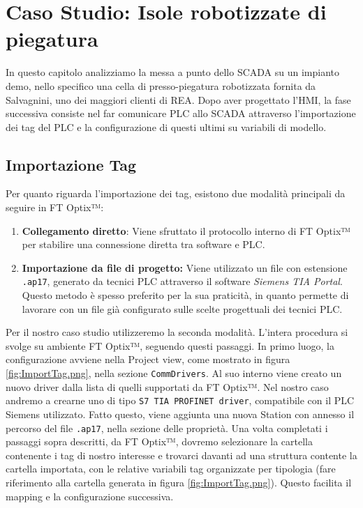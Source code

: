 \chapter{Caso Studio: Isole robotizzate di piegatura} \label{sec:CasoStudio}

In questo capitolo analizziamo la messa a punto dello SCADA su un impianto demo, nello specifico una cella di presso-piegatura robotizzata fornita da Salvagnini, uno dei maggiori clienti di REA. Dopo aver progettato l'HMI, la fase successiva consiste nel far comunicare PLC allo SCADA attraverso l'importazione dei tag del PLC e la configurazione di questi ultimi su variabili di modello.

\section{Importazione Tag}
Per quanto riguarda l'importazione dei tag, esistono due modalità principali da seguire in FT Optix™:
\begin{enumerate}
    \item \textbf{Collegamento diretto}: Viene sfruttato il protocollo interno di FT Optix™ per stabilire una connessione diretta tra software e PLC.
    \item \textbf{Importazione da file di progetto:} Viene utilizzato un file con estensione \verb|.ap17|, generato da tecnici PLC attraverso il software \textit{Siemens TIA Portal}. Questo metodo è spesso preferito per la sua praticità, in quanto permette di lavorare con un file già configurato sulle scelte progettuali dei tecnici PLC.
\end{enumerate}
Per il nostro caso studio utilizzeremo la seconda modalità. L'intera procedura si svolge su ambiente FT Optix™, seguendo questi passaggi. In primo luogo, la configurazione avviene nella Project view, come mostrato in figura \ref{fig:ImportTag.png}, nella sezione \verb|CommDrivers|. Al suo interno viene creato un nuovo driver dalla lista di quelli supportati da FT Optix™. Nel nostro caso andremo a crearne uno di tipo \verb|S7 TIA PROFINET driver|, compatibile con il PLC Siemens utilizzato. Fatto questo, viene aggiunta una nuova Station con annesso il percorso del file \verb|.ap17|, nella sezione delle proprietà. Una volta completati i passaggi sopra descritti, da FT Optix™, dovremo selezionare la cartella contenente i tag di nostro interesse e trovarci davanti ad una struttura contente la cartella importata, con le relative variabili tag organizzate per tipologia (fare riferimento alla cartella generata in figura \ref{fig:ImportTag.png}). Questo facilita il mapping e la configurazione successiva.

